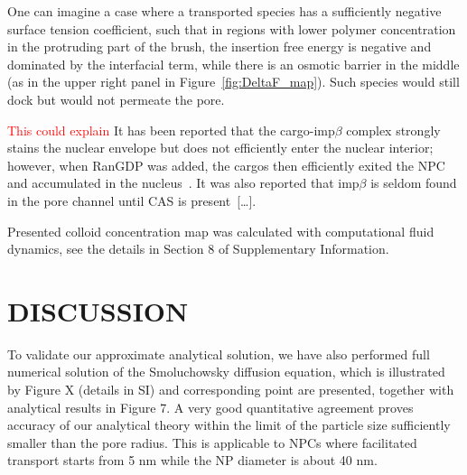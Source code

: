 \documentclass[12pt, a4paper]{article}
\newcommand\todo[1]{\textcolor{red}{#1}}
\begin{document}
One can imagine a case where a transported species has a sufficiently negative surface tension coefficient, such that in regions with lower polymer concentration in the protruding part of the brush, the insertion free energy is negative and dominated by the interfacial term, while there is an osmotic barrier in the middle (as in the upper right panel in Figure~\ref{fig:DeltaF_map}).
Such species would still dock but would not permeate the pore.

\todo{This could explain}
It has been reported that the cargo-imp$\beta$ complex strongly stains the nuclear envelope but does not efficiently enter the nuclear interior; however, when RanGDP was added, the cargos then efficiently exited the NPC and accumulated in the nucleus~\cite{Lowe2015}.
It was also reported that imp$\beta$ is seldom found in the pore channel until CAS is present~[\dots].


Presented colloid concentration map was calculated with computational fluid dynamics, see the details in Section 8 of Supplementary Information.
\section{DISCUSSION}


To validate our approximate analytical solution, we have also performed full numerical solution of the Smoluchowsky diffusion equation, which is illustrated by Figure X 
(details in SI) and corresponding point are presented, together with analytical results in Figure 7. A very good quantitative agreement proves accuracy of our analytical theory
within the limit of the particle size sufficiently smaller than the pore radius. This is applicable to NPCs where facilitated transport starts from 5 nm while the
NP diameter is about 40 nm.
\end{document}
